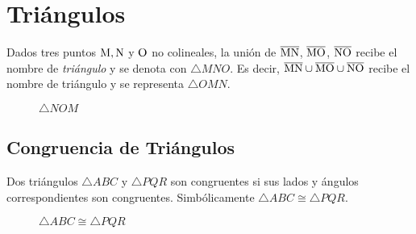 \clearpage
\section{Triángulos}

\begin{definition}
    Dados tres puntos $\rm M,N$ y $\rm O$ no colineales, la unión de $\overline{\rm MN}$, $\overline{\rm MO}$, $\overline{\rm NO}$ recibe el nombre de \textit{triángulo} y se denota con $\triangle{MNO}$. Es decir, $\overline{\rm MN} \cup \overline{\rm MO} \cup \overline{\rm NO}$ recibe el nombre de triángulo y se representa $\triangle{OMN}$.

    \begin{figure}[!h]
        \centering
        
        \caption{$\triangle{NOM}$}
        \label{fig:triang}
    \end{figure}
    
\end{definition}

\subsection{Congruencia de Triángulos}

\begin{definition}
    Dos triángulos $\triangle{ABC}$ y $\triangle{PQR}$ son congruentes si sus lados y ángulos correspondientes son congruentes. Simbólicamente $\triangle{ABC} \cong \triangle{PQR}$.

    \begin{figure}[h!]

        \centering

        \begin{subfigure}[b]{.5\textwidth}
            \centering
            
            \label{fig:triang-cong-1}
        \end{subfigure}%
        \begin{subfigure}[b]{.5\textwidth}
            \centering
            
            \label{fig:triang-cong-2}
        \end{subfigure}

        \centering
        \caption{$\triangle{ABC} \cong \triangle{PQR}$}
        \label{fig:triang-cong}
        
    \end{figure}    
    
\end{definition}

